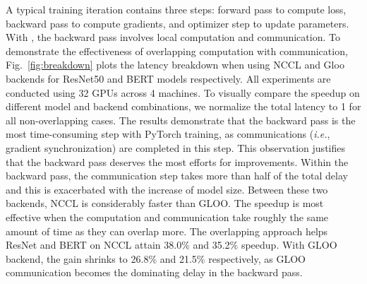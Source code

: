 A typical training iteration contains three steps: forward pass to compute loss, backward pass to compute gradients, and optimizer step to update parameters. 
With , the backward pass involves local computation and  communication. To demonstrate the effectiveness of overlapping computation with communication, Fig.~\ref{fig:breakdown} plots the latency breakdown when using NCCL and Gloo backends for ResNet50 and BERT models respectively. All experiments are conducted using 32 GPUs across 4 machines. To visually compare the speedup on different model and backend combinations, we normalize the total latency to 1 for all non-overlapping cases. 
The results demonstrate that the backward pass is the most time-consuming step with PyTorch  training, as  communications (\emph{i.e.}, gradient synchronization) are completed in this step. This observation justifies that the  backward pass deserves the most efforts for improvements. Within the backward pass, the communication step takes more than half of the total delay and this is exacerbated with the increase of model size. Between these two backends, NCCL is considerably faster than GLOO. The speedup is most effective when the computation and communication take roughly the same amount of time as they can overlap more. The overlapping approach helps ResNet and BERT on NCCL attain 38.0\% and 35.2\% speedup. With GLOO backend, the gain shrinks to 26.8\% and 21.5\% respectively, as GLOO communication becomes the dominating delay in the backward pass.  
%







